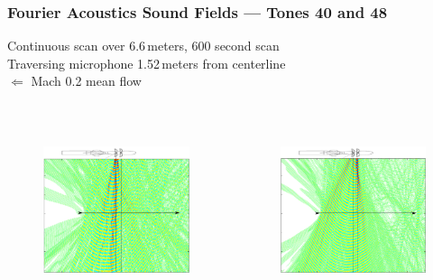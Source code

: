\documentclass[aspectratio=169,10pt]{beamer} \mode<presentation>
\begin{document}
\begin{frame}
\frametitle{Fourier Acoustics Sound Fields --- Tones 40 and 48}
{ Continuous scan over 6.6\,meters, 600 second scan\\
Traversing microphone 1.52\,meters from centerline\\
\raisebox{-1ex} {\Huge $\Longleftarrow$} Mach 0.2 mean flow}
\vspace{-1em}
  \begin{columns}[T]
    \vspace{-1em}
    \begin{figure}
      \includegraphics[width=6cm,height=5.5cm]{O40S2H}
    \end{figure}
    \vspace{-1em}
    \begin{figure}
      \includegraphics[width=6cm,height=5.5cm]{O48S1H}
    \end{figure}
  \end{columns}
\end{frame}
\end{document}

